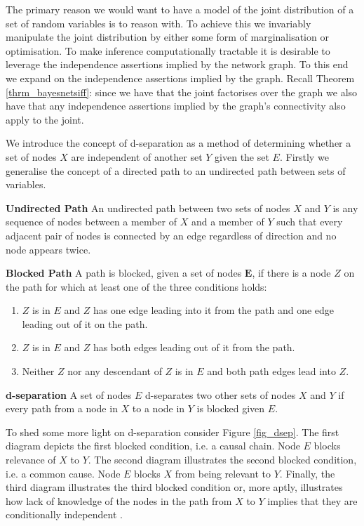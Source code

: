 \documentclass[../masters.tex]{subfiles}
\begin{document}
The primary reason we would want to have a model of the joint distribution of a set of random variables is to reason with. To achieve this we invariably manipulate the joint distribution by either some form of marginalisation or optimisation. To make inference computationally tractable it is desirable to leverage the independence assertions implied by the network graph. To this end we expand on the independence assertions implied by the graph. Recall Theorem \ref{thrm_bayesnetsiff}: since we have that the joint factorises over the graph we also have that any independence assertions implied by the graph's connectivity also apply to the joint.

We introduce the concept of d-separation as a method of determining whether a set of nodes $X$ are independent of another set $Y$ given the set $E$. Firstly we generalise the concept of a directed path to an undirected path between sets of variables.
\begin{defn}
\textbf{Undirected Path} An undirected path between two sets of nodes $X$ and $Y$ is any sequence of nodes between a member of $X$ and a member of $Y$ such that every adjacent pair of nodes is connected by an edge regardless of direction and no node appears twice.
\end{defn}
\begin{defn}
\textbf{Blocked Path} A path is blocked, given a set of nodes $\mathbf{E}$, if there is a node $Z$ on the path for which at least one of the three conditions holds:
\begin{enumerate}
\item
$Z$ is in $E$ and $Z$ has one edge leading into it from the path and one edge leading out of it on the path.
\item
$Z$ is in $E$ and $Z$ has both edges leading out of it from the path.
\item
Neither $Z$ nor any descendant of $Z$ is in $E$ and both path edges lead into $Z$.
\end{enumerate}
\end{defn}
\begin{defn}
\textbf{d-separation} A set of nodes $E$ d-separates two other sets of nodes $X$ and $Y$ if every path from a node in $X$ to a node in $Y$ is blocked given $E$.
\end{defn}
To shed some more light on d-separation consider Figure \ref{fig_dsep}. The first diagram depicts the first blocked condition, i.e. a causal chain. Node $E$ blocks relevance of $X$ to $Y$. The second diagram illustrates the second blocked condition, i.e. a common cause. Node $E$ blocks $X$ from being relevant to $Y$. Finally, the third diagram illustrates the third blocked condition or, more aptly, illustrates how lack of knowledge of the nodes in the path from $X$ to $Y$ implies that they are conditionally independent \cite{korb}.
\end{document}
